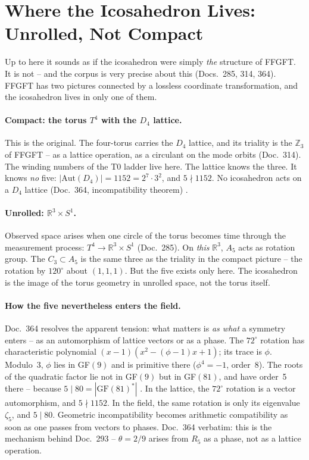 \section{Where the Icosahedron Lives: Unrolled, Not Compact}

Up to here it sounds as if the icosahedron were simply \emph{the} structure
of FFGFT. It is not -- and the corpus is very precise about this (Docs.~285,
314, 364). FFGFT has two pictures connected by a lossless coordinate
transformation, and the icosahedron lives in only one of them.

\paragraph{Compact: the torus $T^4$ with the $D_4$ lattice.}
This is the original. The four-torus carries the $D_4$ lattice, and its
triality is the $\mathbb{Z}_3$ of FFGFT -- as a lattice operation, as a
circulant on the mode orbits (Doc.~314). The winding numbers of the T0 ladder
live here. The lattice knows the three. It knows \emph{no} five:
$|\text{Aut}(D_4)| = 1152 = 2^7\cdot3^2$, and $5\nmid1152$. No icosahedron acts
on a $D_4$ lattice (Doc.~364, incompatibility theorem) \BM.

\paragraph{Unrolled: $\mathbb{R}^3\times S^1$.}
Observed space arises when one circle of the torus becomes time through the
measurement process: $T^4\to\mathbb{R}^3\times S^1$ (Doc.~285). On
\emph{this} $\mathbb{R}^3$, $A_5$ acts as rotation group. The $C_3\subset A_5$
is the same three as the triality in the compact picture -- the rotation by
$120^\circ$ about $(1,1,1)$. But the five exists only here. The icosahedron is
the image of the torus geometry in unrolled space, not the torus itself.

\paragraph{How the five nevertheless enters the field.}
Doc.~364 resolves the apparent tension: what matters is \emph{as what} a
symmetry enters -- as an automorphism of lattice vectors or as a phase. The
$72^\circ$ rotation has characteristic polynomial $(x-1)(x^2-(\phi-1)x+1)$;
its trace is $\phi$. Modulo~3, $\phi$ lies in GF$(9)$ and is primitive there
($\phi^4=-1$, order~8). The roots of the quadratic factor lie not in GF$(9)$
but in GF$(81)$, and have order~5 there -- because $5\mid80=|\text{GF}(81)^*|$
\BM. In the lattice, the $72^\circ$ rotation is a vector automorphism, and
$5\nmid1152$. In the field, the same rotation is only its eigenvalue $\zeta_5$,
and $5\mid80$. Geometric incompatibility becomes arithmetic compatibility as
soon as one passes from vectors to phases. Doc.~364 verbatim: this is the
mechanism behind Doc.~293 -- $\theta=2/9$ arises from $R_5$ as a phase, not as
a lattice operation.


